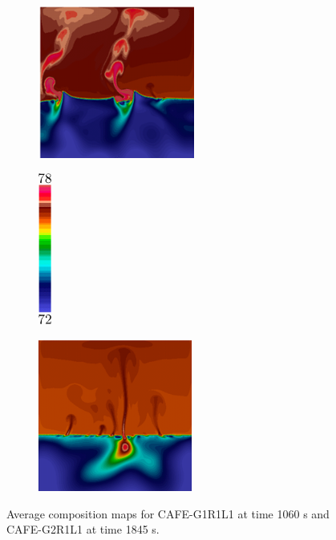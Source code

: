 \begin{figure}[htbp]
\centering
  \begin{subfigure}{0.4\textwidth}
    \centering
	\includegraphics[height=5cm]{Chapter4/Graphics/freckle_cafe/cafe_VG1_composition.png}
	\caption{}
    \label{fig:cafe_VG1}
  \end{subfigure}
  \begin{subfigure}{0.01\textwidth}
    \centering
	\includegraphics[height=5cm]{Chapter4/Graphics/freckle_cafe/cafe_VG_colorbar_annot.png}
    \label{} %
  \end{subfigure}
  \hspace{2mm}
   \begin{subfigure}{0.4\textwidth}
    \centering
	\includegraphics[height=5cm]{Chapter4/Graphics/freckle_cafe/cafe_VG2_composition.png}
	\caption{}
    \label{fig:cafe_VG2}
  \end{subfigure}
\caption{Average composition maps for CAFE-G1R1L1 at time 1060 s and CAFE-G2R1L1 at time 1845 s.} 
\label{fig:cafe_G1G2}
\end{figure}

